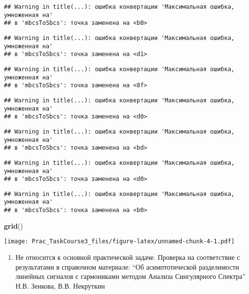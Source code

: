 \documentclass[
]{article}
\newenvironment{Shaded}{\begin{snugshade}}{\end{snugshade}}
\newcommand{\FunctionTok}[1]{\textcolor[rgb]{0.13,0.29,0.53}{\textbf{#1}}}
\newcommand{\NormalTok}[1]{#1}
\providecommand{\tightlist}{%
  \setlength{\itemsep}{0pt}\setlength{\parskip}{0pt}}
\begin{document}
\begin{verbatim}
## Warning in title(...): ошибка конвертации 'Максимальная ошибка, умноженная на'
## в 'mbcsToSbcs': точка заменена на <b0>
\end{verbatim}

\begin{verbatim}
## Warning in title(...): ошибка конвертации 'Максимальная ошибка, умноженная на'
## в 'mbcsToSbcs': точка заменена на <d1>
\end{verbatim}

\begin{verbatim}
## Warning in title(...): ошибка конвертации 'Максимальная ошибка, умноженная на'
## в 'mbcsToSbcs': точка заменена на <8f>
\end{verbatim}

\begin{verbatim}
## Warning in title(...): ошибка конвертации 'Максимальная ошибка, умноженная на'
## в 'mbcsToSbcs': точка заменена на <d0>
\end{verbatim}

\begin{verbatim}
## Warning in title(...): ошибка конвертации 'Максимальная ошибка, умноженная на'
## в 'mbcsToSbcs': точка заменена на <bd>
\end{verbatim}

\begin{verbatim}
## Warning in title(...): ошибка конвертации 'Максимальная ошибка, умноженная на'
## в 'mbcsToSbcs': точка заменена на <d0>
\end{verbatim}

\begin{verbatim}
## Warning in title(...): ошибка конвертации 'Максимальная ошибка, умноженная на'
## в 'mbcsToSbcs': точка заменена на <b0>
\end{verbatim}

\begin{Shaded}
\begin{Highlighting}[]
\FunctionTok{grid}\NormalTok{()}
\end{Highlighting}
\end{Shaded}

\texttt{[image: Prac\_TaskCourse3\_files/figure-latex/unnamed-chunk-4-1.pdf]}

\begin{enumerate}
\def\labelenumi{\arabic{enumi}.}
\setcounter{enumi}{2}
\tightlist
\item
  Не относится к основной практической задаче. Проверка на соответствие
  с результатами в справочном материале: ``Об асимптотической
  разделимости линейных сигналов с гармониками методом Анализа
  Сингулярного Спектра'' Н.В. Зенкова, В.В. Некруткин
\end{enumerate}
\end{document}
